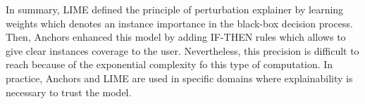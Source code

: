 In summary, LIME defined the principle of perturbation explainer by learning 
weights which denotes an instance importance in the black-box decision process. 
Then, Anchors enhanced this model by adding IF-THEN rules which allows to 
give clear instances coverage to the user. 
Nevertheless, this precision is difficult to reach because of the exponential 
complexity fo this type of computation. In practice, Anchors and LIME are used in 
specific domains where explainability is necessary to trust the model. 